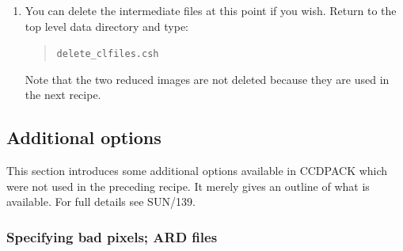 \documentclass[twoside,11pt]{article}
\newcommand{\xref}[3]{#1}
\begin{document}
\begin{enumerate}
   The input files are the two de-biassed target images in subdirectory
   {\tt targets}.  The flat fielded images will be created in the same
   directory and with the same basic file names but with `{\tt \_flt}'
   appended.  That is, the following two files will be created:

  \begin{quote}
   {\tt targets/ngc2336\_r\_1\_deb\_flt.sdf \\
   targets/ngc2336\_r\_2\_deb\_flt.sdf}
  \end{quote}

   These images should be a true representation of the brightness
   distribution in the region of sky observed (subject to the constraints
   of atmospheric seeing and instrumental resolution, of course).  The
   images can, for example, be displayed with GAIA.  Type:

  \begin{quote}
   {\tt gaia targets/ngc2336\_r\_2\_deb\_flt.sdf \&}
  \end{quote}

   After setting the {\sf Auto Cut} level, {\sf Magnification} and colour
   table (see the recipe in Section~\ref{DISPLAY}) the reduced image should 
   appear similar to the ones in the previous recipe (see
   Figure~\ref{GAIAREDUCE}).

  \item You can delete the intermediate files at this point if you wish.
   Return to the top level data directory and type:

  \begin{quote}
   {\tt delete\_clfiles.csh}
  \end{quote}

   Note that the two reduced images are not deleted because they are used
   in the next recipe.

\end{enumerate}

\subsection{\label{ADDOPT}Additional options}

This section introduces some additional options available in CCDPACK
which were not used in the preceding recipe.  It merely gives an outline
of what is available.  For full details see
\xref{SUN/139}{sun139}{}\/\cite{SUN139}.

\subsubsection{Specifying bad pixels; ARD files}
\end{document}
